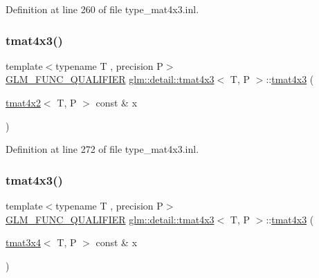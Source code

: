 Definition at line 260 of file type\+\_\+mat4x3.\+inl.

\mbox{\label{structglm_1_1detail_1_1tmat4x3_ad4cb1c5b3a6ad74693fe746227cfedfc}} 
\subsubsection{\texorpdfstring{tmat4x3()}{tmat4x3()}\hspace{0.1cm}{\footnotesize\ttfamily [17/22]}}
{\footnotesize\ttfamily template$<$typename T , precision P$>$ \\
\hyperlink{setup_8hpp_a33fdea6f91c5f834105f7415e2a64407}{G\+L\+M\+\_\+\+F\+U\+N\+C\+\_\+\+Q\+U\+A\+L\+I\+F\+I\+ER} \hyperlink{structglm_1_1detail_1_1tmat4x3}{glm\+::detail\+::tmat4x3}$<$ T, P $>$\+::\hyperlink{structglm_1_1detail_1_1tmat4x3}{tmat4x3} (\begin{DoxyParamCaption}\item[{\hyperlink{structglm_1_1detail_1_1tmat4x2}{tmat4x2}$<$ T, P $>$ const \&}]{x }\end{DoxyParamCaption})\hspace{0.3cm}{\ttfamily [explicit]}}



Definition at line 272 of file type\+\_\+mat4x3.\+inl.

\mbox{\label{structglm_1_1detail_1_1tmat4x3_a32e156d1285cba8461250e7035a6fad3}} 
\subsubsection{\texorpdfstring{tmat4x3()}{tmat4x3()}\hspace{0.1cm}{\footnotesize\ttfamily [18/22]}}
{\footnotesize\ttfamily template$<$typename T , precision P$>$ \\
\hyperlink{setup_8hpp_a33fdea6f91c5f834105f7415e2a64407}{G\+L\+M\+\_\+\+F\+U\+N\+C\+\_\+\+Q\+U\+A\+L\+I\+F\+I\+ER} \hyperlink{structglm_1_1detail_1_1tmat4x3}{glm\+::detail\+::tmat4x3}$<$ T, P $>$\+::\hyperlink{structglm_1_1detail_1_1tmat4x3}{tmat4x3} (\begin{DoxyParamCaption}\item[{\hyperlink{structglm_1_1detail_1_1tmat3x4}{tmat3x4}$<$ T, P $>$ const \&}]{x }\end{DoxyParamCaption})\hspace{0.3cm}{\ttfamily [explicit]}}



